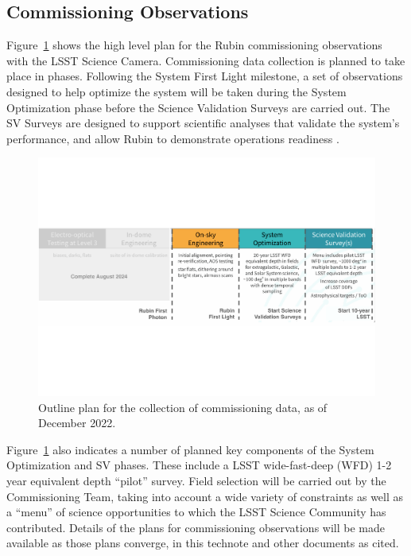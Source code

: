 \subsection{Commissioning Observations}
\label{ssec:commissioning-observations}

Figure~\ref{fig:commissioning} shows the high level plan for the Rubin commissioning observations with the LSST Science Camera.
Commissioning data collection is planned to take place in phases.
Following the System First Light milestone, a set of observations designed to help optimize the system will be taken during the System Optimization phase before the Science Validation Surveys are carried out. 
The SV Surveys are designed to support scientific analyses that validate the system's performance, and allow Rubin to demonstrate operations readiness \citep{SITCOMTN-005}.

\begin{figure}[htb]
\centering
\includegraphics[width=0.95\linewidth]{figures/commissioning-plan}
\caption{Outline plan for the collection of commissioning data, as of December 2022.}
\label{fig:commissioning}
\end{figure}

Figure~\ref{fig:commissioning} also indicates a number of planned key components of the System Optimization and SV phases.
These include a LSST wide-fast-deep (WFD) 1-2 year equivalent depth ``pilot'' survey.
Field selection will be carried out by the Commissioning Team, taking into account a wide variety of constraints as well as a ``menu'' of science opportunities to which the LSST Science Community has contributed.
Details of the plans for commissioning observations will be made available as those plans converge, in this technote and other documents as cited.





